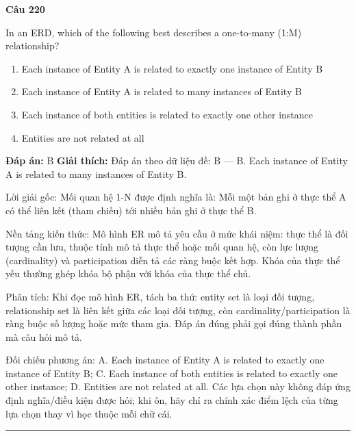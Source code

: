 \documentclass[11pt,a4paper]{article}
\newenvironment{question}[1]{%
  \par\vspace{1em}\noindent\textbf{\large Câu #1}\par\vspace{0.4em}
}{%
  \par\vspace{1em}\hrule\vspace{0.6em}
}
\newenvironment{choices}{%
  \begin{enumerate}[label=\textbf{\Alph*.},leftmargin=2.2em,itemsep=2pt,topsep=3pt]
}{%
  \end{enumerate}
}
\newcommand{\choice}{\item}
\begin{document}
\begin{question}{220}
In an ERD, which of the following best describes a one-to-many (1:M) relationship?
\begin{choices}
\choice Each instance of Entity A is related to exactly one instance of Entity B
\choice Each instance of Entity A is related to many instances of Entity B
\choice Each instance of both entities is related to exactly one other instance
\choice Entities are not related at all
\end{choices}
\textbf{Đáp án:} B
\textbf{Giải thích:} Đáp án theo dữ liệu đề: B — B. Each instance of Entity A is related to many instances of Entity B.

Lời giải gốc: Mối quan hệ 1-N được định nghĩa là: Mỗi một bản ghi ở thực thể A có thể liên kết (tham chiếu) tới nhiều bản ghi ở thực thể B.

Nền tảng kiến thức: Mô hình ER mô tả yêu cầu ở mức khái niệm: thực thể là đối tượng cần lưu, thuộc tính mô tả thực thể hoặc mối quan hệ, còn lực lượng (cardinality) và participation diễn tả các ràng buộc kết hợp. Khóa của thực thể yếu thường ghép khóa bộ phận với khóa của thực thể chủ.

Phân tích: Khi đọc mô hình ER, tách ba thứ: entity set là loại đối tượng, relationship set là liên kết giữa các loại đối tượng, còn cardinality/participation là ràng buộc số lượng hoặc mức tham gia. Đáp án đúng phải gọi đúng thành phần mà câu hỏi mô tả.

Đối chiếu phương án: A. Each instance of Entity A is related to exactly one instance of Entity B; C. Each instance of both entities is related to exactly one other instance; D. Entities are not related at all. Các lựa chọn này không đáp ứng định nghĩa/điều kiện được hỏi; khi ôn, hãy chỉ ra chính xác điểm lệch của từng lựa chọn thay vì học thuộc mỗi chữ cái.
\end{question}
\end{document}
